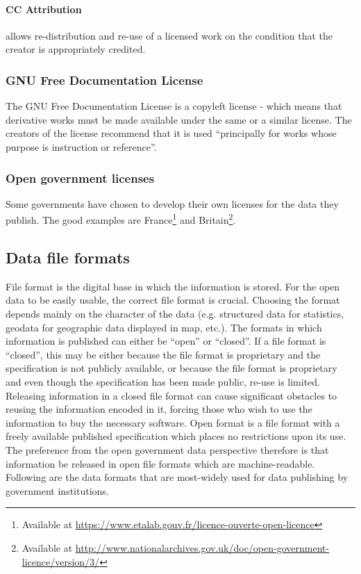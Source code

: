 \documentclass[thesis=B,english]{FITthesis}[2012/06/26]
\begin{document}
	\paragraph{CC Attribution}
	allows re-distribution and re-use of a licensed work on the condition that the creator is appropriately credited.
	\subsubsection{GNU Free Documentation License}
	The GNU Free Documentation License is a copyleft license - which means that derivative works must be made available under the same or a similar license. The creators of the license recommend that it is used ``principally for works whose purpose is instruction or reference''.
	\subsubsection{Open government licenses}
	\label{opengovernmentlicense}
	Some governments have chosen to develop their own licenses for the data they publish. The good examples are France\footnote{Available at \url{https://www.etalab.gouv.fr/licence-ouverte-open-licence}} and Britain\footnote{Available at \url{http://www.nationalarchives.gov.uk/doc/open-government-licence/version/3/}}.
	\subsection{Data file formats}
	\label{fileformats}
	 File format is the digital base in which the information is stored. For the open data to be easily usable, the correct file format is crucial. Choosing the format depends mainly on the character of the data (e.g. structured data for statistics, geodata for geographic data displayed in map, etc.). The formats in which information is published can either be “open” or “closed”. If a file format is “closed”, this may be either because the file format is proprietary and the specification is not publicly available, or because the file format is proprietary and even though the specification has been made public, re-use is limited. Releasing information in a closed file format can cause significant obstacles to reusing the information encoded in it, forcing those who wish to use the information to buy the necessary software. Open format is a file format with a freely available published specification which places no restrictions upon its use. The preference from the open government data perspective therefore is that information be released in open file formats which are machine-readable. Following are the data formats that are most-widely used for data publishing by government institutions.\cite{opendatahandbookfileformats}
	 
\end{document}
